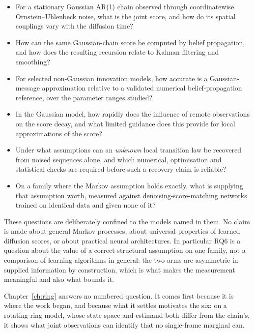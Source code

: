 \begin{itemize}
  \item[\textbf{RQ1.}] For a stationary Gaussian AR(1) chain observed
  through coordinatewise Ornstein--Uhlenbeck noise, what is the joint
  score, and how do its spatial couplings vary with the diffusion time?

  \item[\textbf{RQ2.}] How can the same Gaussian-chain score be computed
  by belief propagation, and how does the resulting recursion relate to
  Kalman filtering and smoothing?

  \item[\textbf{RQ3.}] For selected non-Gaussian innovation models, how
  accurate is a Gaussian-message approximation relative to a validated
  numerical belief-propagation reference, over the parameter ranges
  studied?

  \item[\textbf{RQ4.}] In the Gaussian model, how rapidly does the
  influence of remote observations on the score decay, and what limited
  guidance does this provide for local approximations of the score?

  \item[\textbf{RQ5.}] Under what assumptions can an \emph{unknown} local
  transition law be recovered from noised sequences alone, and which
  numerical, optimisation and statistical checks are required before such
  a recovery claim is reliable?

  \item[\textbf{RQ6.}] On a family where the Markov assumption holds
  exactly, what is supplying that assumption worth, measured against
  denoising-score-matching networks trained on identical data and given
  none of it?
\end{itemize}

These questions are deliberately confined to the models named in them.
No claim is made about general Markov processes, about universal
properties of learned diffusion scores, or about practical neural
architectures. In particular RQ6 is a question about the value of a
correct structural assumption on one family, not a comparison of learning
algorithms in general: the two arms are asymmetric in supplied
information by construction, which is what makes the measurement
meaningful and also what bounds it.

Chapter~\ref{ch:ring} answers no numbered question. It comes first because it
is where the work began, and because what it settles motivates the six: on a
rotating-ring model, whose state space and estimand both differ from the
chain's, it shows what joint observations can identify that no single-frame
marginal can.

